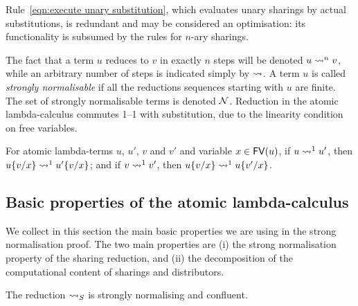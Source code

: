 \documentclass[orivec]{llncs}
\begin{document}
\begin{remark}
Rule~\eqref{eqn:execute unary substitution}, which evaluates unary sharings by actual substitutions, is redundant and may be considered an optimisation: its functionality is subsumed by the rules for $n$-ary sharings.
\end{remark}
%


The fact that a term $u$ reduces to $v$ in exactly $n$ steps will be denoted $u \rewrite^n v$, while an arbitrary number of steps is indicated simply by $\rewrite$.
%
A term $u$ is called \emph{strongly normalisable} if all the reductions sequences starting with $u$ are finite.
%
The set of strongly normalisable terms is denoted $\mathcal{N}$.
%
Reduction in the atomic lambda-calculus commutes 1--1 with substitution, due to the linearity condition on free variables.


\begin{ALlemma}
For atomic lambda-terms $u$, $u'$, $v$ and $v'$ and variable $x \in {\mathop{\mathsf{FV}}}(u)$,
%
if $u \rewrite^1 u'$, then $u\sub xv \rewrite^1 u'\sub xv$; and
if $v\rewrite^1 v'$, then $u\sub xv \rewrite^1 u\sub x{v'}$.
\end{ALlemma}


\subsection{Basic properties of the atomic lambda-calculus}
\label{ssec:basic properties}

We collect in this section the main basic properties we are using in the strong normalisation proof. The two main properties are (i) the strong normalisation property of the sharing reduction, and (ii) the  decomposition of the computational content of sharings and distributors.

\begin{ALtheorem}
The reduction $\ALnotbeta$ is strongly normalising and confluent.
\end{ALtheorem}
\end{document}
